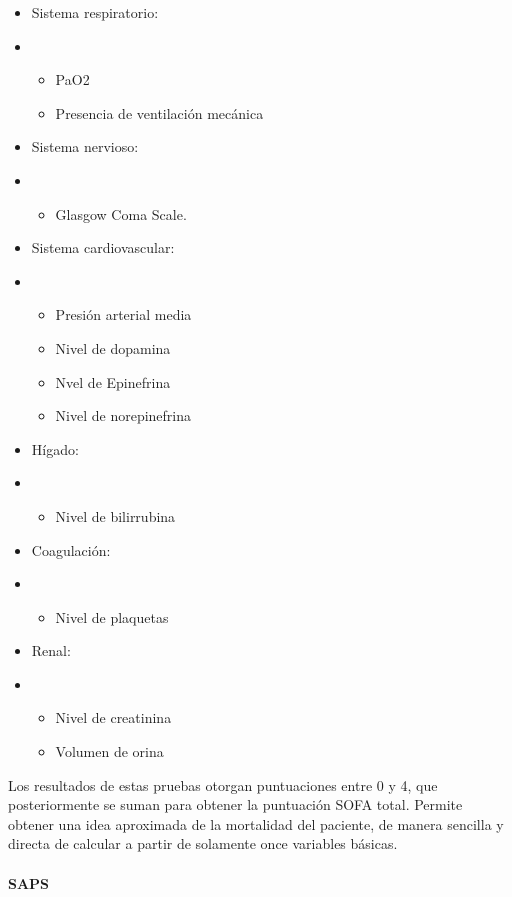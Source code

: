 \documentclass{report}
\begin{document}
\begin{itemize}
\item
  Sistema respiratorio:
\item
  \begin{itemize}
  \item
    PaO2
  \item
    Presencia de ventilación mecánica
  \end{itemize}
\item
  Sistema nervioso:
\item
  \begin{itemize}
  \item
    Glasgow Coma Scale. 
  \end{itemize}
\item
  Sistema cardiovascular:
\item
  \begin{itemize}
  \item
    Presión arterial media
  \item
    Nivel de dopamina
  \item
    Nvel de Epinefrina
  \item
    Nivel de norepinefrina
  \end{itemize}
\item
  Hígado:
\item
  \begin{itemize}
  \item
    Nivel de bilirrubina
  \end{itemize}
\item
  Coagulación:
\item
  \begin{itemize}
  \item
    Nivel de plaquetas
  \end{itemize}
\item
  Renal:
\item
  \begin{itemize}
  \item
    Nivel de creatinina
  \item
    Volumen de orina
  \end{itemize}
\end{itemize}

Los resultados de estas pruebas otorgan puntuaciones entre 0 y 4, que
posteriormente se suman para obtener la puntuación SOFA total. Permite
obtener una idea aproximada de la mortalidad del paciente, de manera
sencilla y directa de calcular a partir de solamente once variables
básicas.
\paragraph{SAPS}
\end{document}
